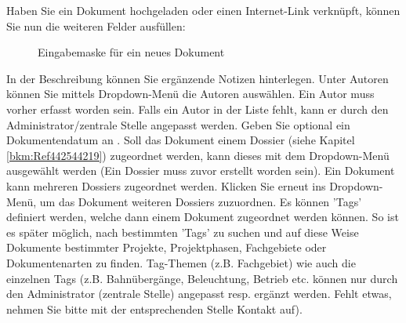 \vspace{\baselineskip}

Haben Sie ein Dokument hochgeladen oder einen Internet-Link verknüpft, können Sie nun die weiteren Felder ausfüllen:

\begin{figure}[H]
\caption{Eingabemaske für ein neues Dokument}
\end{figure}

\vspace{\baselineskip}

In der Beschreibung  können Sie ergänzende Notizen hinterlegen. Unter Autoren  können Sie mittels Dropdown-Menü die Autoren auswählen. Ein Autor muss vorher erfasst worden sein. Falls ein Autor in der Liste fehlt, kann er durch den Administrator/zentrale Stelle angepasst werden. Geben Sie optional ein Dokumentendatum an . Soll das Dokument einem Dossier (siehe Kapitel \ref{bkm:Ref442544219}) zugeordnet werden, kann dieses mit dem Dropdown-Menü  ausgewählt werden (Ein Dossier muss zuvor erstellt worden sein). Ein Dokument kann mehreren Dossiers zugeordnet werden. Klicken Sie erneut ins Dropdown-Menü, um das Dokument weiteren Dossiers zuzuordnen. Es können 'Tags'  definiert werden, welche dann einem Dokument zugeordnet werden können. So ist es später möglich, nach bestimmten 'Tags' zu suchen und auf diese Weise Dokumente bestimmter Projekte, Projektphasen, Fachgebiete oder Dokumentenarten zu finden. Tag-Themen (z.B. Fachgebiet) wie auch die einzelnen Tags (z.B. Bahnübergänge, Beleuchtung, Betrieb etc. können nur durch den Administrator (zentrale Stelle) angepasst resp. ergänzt werden. Fehlt etwas, nehmen Sie bitte mit der entsprechenden Stelle Kontakt auf). \newline

